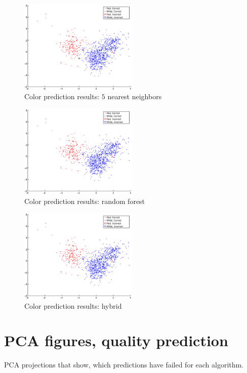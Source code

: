 \documentclass[twoside]{article}
\begin{document}
\begin{multicols}{2}
\begin{figure}[H]
\centering
\includegraphics[width=0.5\textwidth]{colorpca/knn5}
\caption{Color prediction results: $5$ nearest neighbors}
\end{figure}

\begin{figure}[H]
\centering
\includegraphics[width=0.5\textwidth]{colorpca/random_forest}
\caption{Color prediction results: random forest}
\end{figure}

\begin{figure}[H]
\centering
\includegraphics[width=0.5\textwidth]{colorpca/cvv2f_f}
\caption{Color prediction results: hybrid}
\end{figure}

\section{PCA figures, quality prediction}\label{appendix:qualitypcakuvet}
PCA projections that show, which predictions have failed for each algorithm.



\end{multicols}
\end{document}
